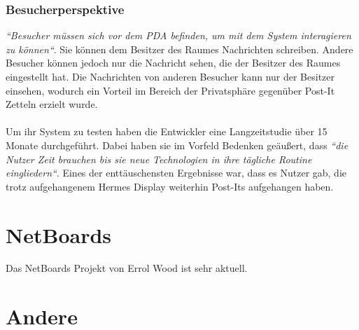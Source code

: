 \subsubsection{Besucherperspektive}
\textit{``Besucher müssen sich vor dem PDA befinden, um mit dem System interagieren zu können``}\cite{cheverest:2003:paper}. Sie können dem Besitzer des Raumes Nachrichten schreiben. Andere Besucher können jedoch nur die Nachricht sehen, die der Besitzer des Raumes eingestellt hat. Die Nachrichten von anderen Besucher kann nur der Besitzer einsehen, wodurch ein Vorteil im Bereich der Privatsphäre gegenüber Post-It Zetteln erzielt wurde.
\\
\\
Um ihr System zu testen haben die Entwickler eine Langzeitstudie über 15 Monate durchgeführt. Dabei haben sie im Vorfeld Bedenken geäußert, dass \textit{``die Nutzer Zeit brauchen bis sie neue Technologien in ihre tägliche Routine eingliedern``}\cite{cheverest:2003:paper}.
Eines der enttäuschensten Ergebnisse war, dass es Nutzer gab, die trotz aufgehangenem Hermes Display weiterhin Post-Its aufgehangen haben\cite{cheverest:2003:paper}.







\section{NetBoards}
Das NetBoards Projekt von Errol Wood\cite{wood:2014} ist sehr aktuell.
\cite{netboards:website}


\section{Andere}

